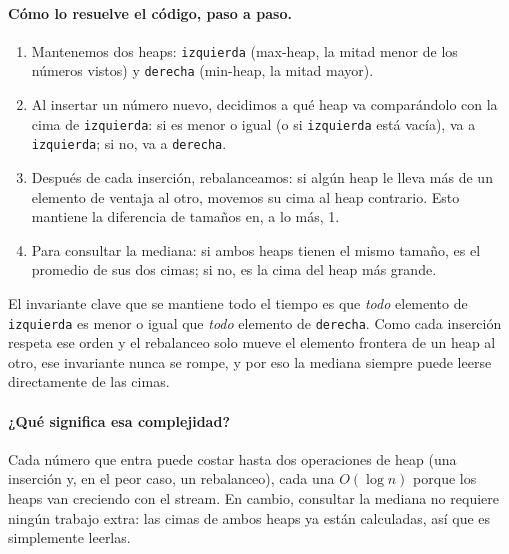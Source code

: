 \paragraph{Cómo lo resuelve el código, paso a paso.}
\begin{enumerate}
  \item Mantenemos dos heaps: \texttt{izquierda} (max-heap, la mitad menor
        de los números vistos) y \texttt{derecha} (min-heap, la mitad
        mayor).
  \item Al insertar un número nuevo, decidimos a qué heap va comparándolo
        con la cima de \texttt{izquierda}: si es menor o igual (o si
        \texttt{izquierda} está vacía), va a \texttt{izquierda}; si no, va
        a \texttt{derecha}.
  \item Después de cada inserción, rebalanceamos: si algún heap le lleva más
        de un elemento de ventaja al otro, movemos su cima al heap
        contrario. Esto mantiene la diferencia de tamaños en, a lo más, 1.
  \item Para consultar la mediana: si ambos heaps tienen el mismo tamaño, es
        el promedio de sus dos cimas; si no, es la cima del heap más grande.
\end{enumerate}
El invariante clave que se mantiene todo el tiempo es que \emph{todo}
elemento de \texttt{izquierda} es menor o igual que \emph{todo} elemento de
\texttt{derecha}. Como cada inserción respeta ese orden y el rebalanceo solo
mueve el elemento frontera de un heap al otro, ese invariante nunca se
rompe, y por eso la mediana siempre puede leerse directamente de las cimas.




\paragraph{¿Qué significa esa complejidad?} Cada número que entra puede
costar hasta dos operaciones de heap (una inserción y, en el peor caso, un
rebalanceo), cada una $O(\log n)$ porque los heaps van creciendo con el
stream. En cambio, consultar la mediana no requiere ningún trabajo extra:
las cimas de ambos heaps ya están calculadas, así que es simplemente leerlas.

